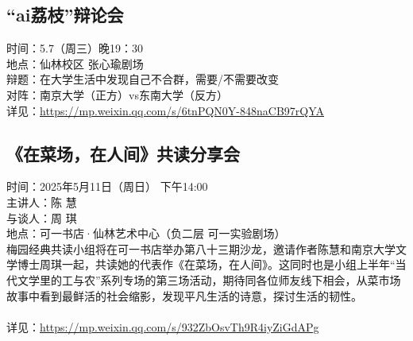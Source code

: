 \documentclass[letterpaper, 12pt]{article}
\begin{document}
\begin{multicols}{2}
\subsection{“ai荔枝”辩论会} %
时间：5.7（周三）晚19：30
\\地点：仙林校区 张心瑜剧场
\\辩题：在大学生活中发现自己不合群，需要/不需要改变
\\对阵：南京大学（正方）vs东南大学（反方）
\\详见：\url{https://mp.weixin.qq.com/s/6tnPQN0Y-848naCB97rQYA}

\subsection{《在菜场，在人间》共读分享会} %
时间：2025年5月11日（周日） 下午14:00
\\主讲人：陈   慧
\\与谈人：周   琪
\\地点：可一书店·仙林艺术中心（负二层 可一实验剧场）
\\梅园经典共读小组将在可一书店举办第八十三期沙龙，邀请作者陈慧和南京大学文学博士周琪一起，共读她的代表作《在菜场，在人间》。这同时也是小组上半年“当代文学里的工与农”系列专场的第三场活动，期待同各位师友线下相会，从菜市场故事中看到最鲜活的社会缩影，发现平凡生活的诗意，探讨生活的韧性。
\\
\\详见：\url{https://mp.weixin.qq.com/s/932ZbOsvTh9R4iyZiGdAPg}
\end{multicols}
\end{document}

